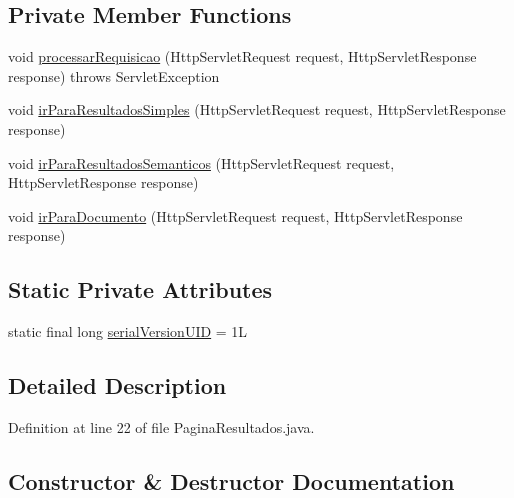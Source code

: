 \subsection*{Private Member Functions}
\begin{DoxyCompactItemize}
\item 
void \hyperlink{classcontrolador_1_1servlets_1_1PaginaResultados_a4c45ab121c5b183b6a40aa3d0d3447de}{processar\+Requisicao} (Http\+Servlet\+Request request, Http\+Servlet\+Response response)  throws Servlet\+Exception 
\item 
void \hyperlink{classcontrolador_1_1servlets_1_1PaginaResultados_ab1ceb8a61e89cb50dc11aad9c79ac749}{ir\+Para\+Resultados\+Simples} (Http\+Servlet\+Request request, Http\+Servlet\+Response response)
\item 
void \hyperlink{classcontrolador_1_1servlets_1_1PaginaResultados_a900331c2d1545949444c5c88aeb7a03f}{ir\+Para\+Resultados\+Semanticos} (Http\+Servlet\+Request request, Http\+Servlet\+Response response)
\item 
void \hyperlink{classcontrolador_1_1servlets_1_1PaginaResultados_a4d8d584ec1bdfea0b521460a01f45e25}{ir\+Para\+Documento} (Http\+Servlet\+Request request, Http\+Servlet\+Response response)
\end{DoxyCompactItemize}
\subsection*{Static Private Attributes}
\begin{DoxyCompactItemize}
\item 
static final long \hyperlink{classcontrolador_1_1servlets_1_1PaginaResultados_a34b97ed1f44305439397ece4c6117929}{serial\+Version\+U\+ID} = 1L
\end{DoxyCompactItemize}


\subsection{Detailed Description}


Definition at line 22 of file Pagina\+Resultados.\+java.



\subsection{Constructor \& Destructor Documentation}
\hypertarget{classcontrolador_1_1servlets_1_1PaginaResultados_add54c1c7fc8493235606b7675f67220b}{}\label{classcontrolador_1_1servlets_1_1PaginaResultados_add54c1c7fc8493235606b7675f67220b} 
